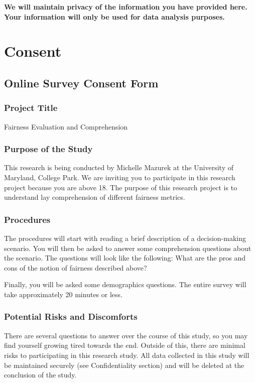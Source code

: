 \documentclass{article}
\begin{document}
\textbf{We will maintain privacy of the information you have provided here. Your information will only be used for data analysis purposes.}

\section{Consent} \label{app:consent}

\subsection{Online Survey Consent Form} \label{app:survey_consent}

\subsubsection{Project Title}
Fairness Evaluation and Comprehension

\subsubsection{Purpose of the Study}
This research is being conducted by Michelle Mazurek at the University of Maryland, College Park. We are inviting you to participate in this research project because you are above 18. The purpose of this research project is to understand lay comprehension of different fairness metrics.  

\subsubsection{Procedures}
The procedures will start with reading a brief description of a decision-making scenario. You will then be asked to answer some comprehension questions about the scenario. The questions will look like the following: What are the pros and cons of the notion of fairness described above?

Finally, you will be asked some demographics questions. The entire survey will take approximately 20 minutes or less.

\subsubsection{Potential Risks and Discomforts}
There are several questions to answer over the course of this study, so you may find yourself growing tired towards the end. Outside of this, there are minimal risks to participating in this research study. All data collected in this study will be maintained securely (see Confidentiality section) and will be deleted at the conclusion of the study.
\end{document}
